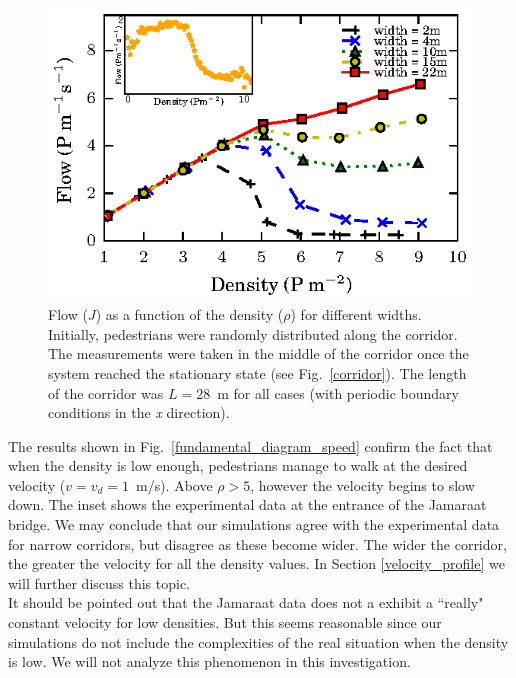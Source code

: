\begin{figure}[htbp!]
\includegraphics[width=\columnwidth]
{plots/flow-density_vd1_multiple_widths.eps}
\caption{\label{fundamental_diagram_flow} Flow ($J$) as a function of the density ($\rho$) for different widths. Initially, 
pedestrians were randomly distributed along the corridor. The measurements were taken in the middle
of the corridor once the system reached the stationary state (see Fig.~\ref{corridor}). The length of the corridor 
was $L=$28~m for all cases (with periodic boundary conditions in the \textit{x} direction).}
\end{figure}

The results shown in Fig.~\ref{fundamental_diagram_speed} confirm the fact that when the density is low enough, pedestrians manage to walk at the desired velocity ($v=v_d=1$~m/s). Above $\rho>5$, however the velocity begins to slow down. The inset shows the experimental data at the entrance of the Jamaraat bridge. We may conclude that our simulations agree with the experimental data for narrow corridors, but disagree as these become wider. The wider the corridor, the greater the velocity for all the density values. In Section \ref{velocity_profile} we will further discuss this topic.\\

It should be pointed out that the Jamaraat data does not a exhibit a ``really" constant velocity for low densities. But this seems reasonable since our simulations do not include the complexities of the real situation when the density is low. We will not analyze this phenomenon in this investigation. \\

